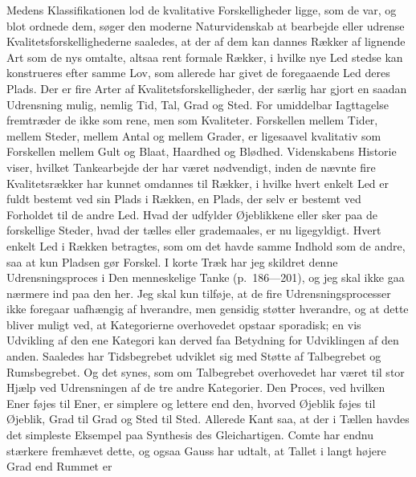 \documentclass[12pt]{article}
\newcommand{\opage}[1]{\marginnote{\footnotesize\textit{[#1]}}}
\begin{document}
Medens Klassifikationen lod de kvalitative Forskelligheder
ligge, som de var, og blot ordnede dem, søger den
moderne Naturvidenskab at bearbejde eller udrense Kvalitetsforskellighederne
saaledes, at der af dem kan dannes
Rækker af lignende Art som de nys omtalte, altsaa rent
formale Rækker, i hvilke nye Led stedse kan konstrueres
efter samme Lov, som allerede har givet de foregaaende
Led deres Plads. Der er fire Arter af Kvalitetsforskelligheder,
der særlig har gjort en saadan Udrensning mulig,
nemlig Tid, Tal, Grad og Sted. For umiddelbar Iagttagelse
fremtræder de ikke som \guillemotright rene\guillemotleft, men som Kvaliteter. Forskellen
mellem Tider, mellem Steder, mellem Antal og
mellem Grader, er ligesaavel kvalitativ som Forskellen
mellem Gult og Blaat, Haardhed og Blødhed. Videnskabens
Historie viser, hvilket Tankearbejde der har været nødvendigt,
inden de nævnte fire Kvalitetsrækker har kunnet omdannes
til Rækker, i hvilke hvert enkelt Led er fuldt bestemt
ved sin Plads i Rækken, en Plads, der selv er bestemt
ved Forholdet til de andre Led. Hvad der udfylder
Øjeblikkene eller sker paa de forskellige Steder, hvad der
tælles eller grademaales, er nu ligegyldigt. Hvert enkelt
\opage{39} \setcounter{footnote}{0}
Led i Rækken betragtes, som om det havde samme Indhold som de
andre, saa at kun Pladsen gør Forskel. I korte Træk har jeg skildret
denne Udrensningsproces i \guillemotright Den menneskelige
Tanke\guillemotleft{} (p.~186---201), og jeg skal ikke gaa nærmere ind
paa den her. Jeg skal kun tilføje, at de fire Udrensningsprocesser ikke
foregaar uafhængig af hverandre, men gensidig støtter hverandre, og at
dette bliver muligt ved, at Kategorierne overhovedet opstaar sporadisk;
en vis Udvikling af den ene Kategori kan derved faa Betydning for
Udviklingen af den anden. Saaledes har Tidsbegrebet udviklet sig med
Støtte af Talbegrebet og Rumsbegrebet. Og det synes, som om
Talbegrebet overhovedet har været til stor Hjælp ved Udrensningen af de
tre andre Kategorier. Den Proces, ved hvilken Ener føjes til Ener, er
simplere og lettere end den, hvorved Øjeblik føjes til Øjeblik, Grad til
Grad og Sted til Sted. Allerede Kant saa, at der i Tællen havdes det
simpleste Eksempel paa \guillemotright Synthesis des
Gleichartigen\guillemotleft . Comte har endnu stærkere fremhævet dette,
og ogsaa Gauss har udtalt, at Tallet i langt højere Grad end Rummet er
\end{document}
